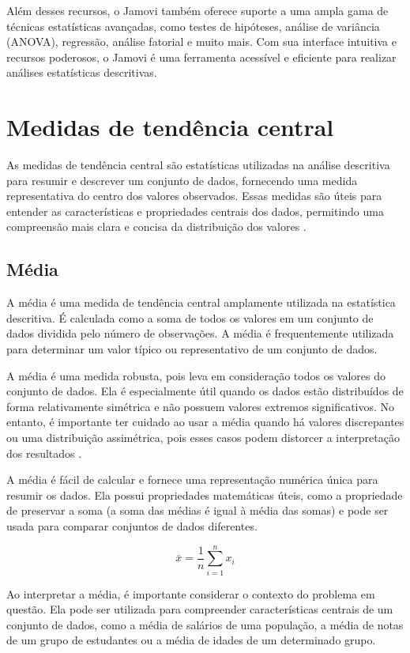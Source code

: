 Além desses recursos, o Jamovi também oferece suporte a uma ampla gama de técnicas estatísticas avançadas, como testes de hipóteses, análise de variância (ANOVA), regressão, análise fatorial e muito mais. Com sua interface intuitiva e recursos poderosos, o Jamovi é uma ferramenta acessível e eficiente para realizar análises estatísticas descritivas.

\section{Medidas de tendência central}

As medidas de tendência central são estatísticas utilizadas na análise descritiva para resumir e descrever um conjunto de dados, fornecendo uma medida representativa do centro dos valores observados. Essas medidas são úteis para entender as características e propriedades centrais dos dados, permitindo uma compreensão mais clara e concisa da distribuição dos valores \parencite{Triola2017}.

\subsection{Média}

A média é uma medida de tendência central amplamente utilizada na estatística descritiva. É calculada como a soma de todos os valores em um conjunto de dados dividida pelo número de observações. A média é frequentemente utilizada para determinar um valor típico ou representativo de um conjunto de dados.

A média é uma medida robusta, pois leva em consideração todos os valores do conjunto de dados. Ela é especialmente útil quando os dados estão distribuídos de forma relativamente simétrica e não possuem valores extremos significativos. No entanto, é importante ter cuidado ao usar a média quando há valores discrepantes ou uma distribuição assimétrica, pois esses casos podem distorcer a interpretação dos resultados \parencite{Triola2017}.

A média é fácil de calcular e fornece uma representação numérica única para resumir os dados. Ela possui propriedades matemáticas úteis, como a propriedade de preservar a soma (a soma das médias é igual à média das somas) e pode ser usada para comparar conjuntos de dados diferentes.

\[
\bar{x} = \frac{1}{n} \sum_{i=1}^{n} x_i
\]

Ao interpretar a média, é importante considerar o contexto do problema em questão. Ela pode ser utilizada para compreender características centrais de um conjunto de dados, como a média de salários de uma população, a média de notas de um grupo de estudantes ou a média de idades de um determinado grupo.


